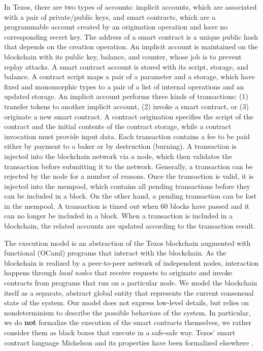 \documentclass[a4paper]{llncs}
\begin{document}
In Tezos, there are two types of accounts: implicit accounts, which are associated with a pair of private/public keys, and smart contracts, which are a programmable account created by an origination operation and have no corresponding secret key. The address of a smart contract is a unique public hash that depends on the creation operation. An implicit account is maintained on the blockchain with its public key, balance, and counter, whose job is to prevent replay attacks. A smart contract account is stored with its script, storage, and balance. A contract script maps a pair of a parameter and a storage, which have fixed and monomorphic types to a pair of a list of internal operations and an updated storage. An implicit account performs three kinds of transactions: (1) transfer tokens to another implicit account, (2) invoke a smart contract, or (3) originate a new smart contract. A contract origination specifies the script of the contract and the initial contents of the contract storage, while a contract invocation must provide input data. Each transaction contains a fee to be paid either by payment to a baker or by destruction (burning). A transaction is injected into the blockchain network via a node, which then validates the transaction before submitting it to the network. Generally, a transaction can be rejected by the node for a number of reasons. Once the transaction is valid, it is injected into the mempool, which contains all pending transactions before they can be included in a block. On the other hand, a pending transaction can be lost in the mempool. A transaction is timed out when 60 blocks have passed and it can no longer be included in a block. When a transaction is included in a blockchain, the related accounts are updated according to the transaction result. 


The execution model is an abstraction of the Tezos blockchain \cite{tezos-whitepaper}
augmented with functional (OCaml) programs that interact with the
blockchain. As the blockchain is realized by a peer-to-peer network of
independent nodes, interaction happens through
\emph{local nodes} that receive requests to originate and invoke
contracts from programs that run on a particular node. We model the blockchain
itself as a separate, abstract global entity that represents the
current consensual state of the system. Our model does not express
low-level details, but relies on nondeterminism to describe
the possible behaviors of the system. In particular, we do
\textbf{not} formalize the execution of the smart contracts
themselves, we rather consider them as black boxes that execute in a
safe-safe way. Tezos' smart contract language Michelson and its
properties have been formalized elsewhere \cite{type-safe-michelson}.
\end{document}
